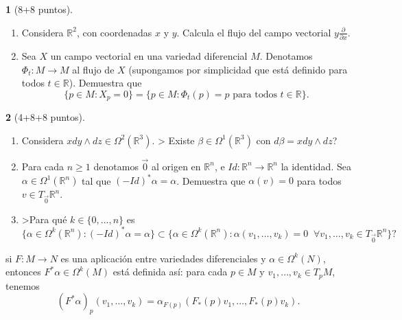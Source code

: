 \documentclass[12pt,a4paper]{report}
\theoremstyle{definition}
\newtheorem{ex}{}
\newcommand{\pd}[1]{\frac{\partial}{\partial #1}} %
\newcommand{\RR}{\ensuremath{\mathbb R}}
\begin{document}
\vspace{0.8cm}



\begin{ex}[8+8 puntos]
$\text{}$
\begin{enumerate}
\item Considera $\RR^2$, con coordenadas $x$ y $y$. Calcula el flujo del campo vectorial $y \pd{x}$.
\item  Sea $X$ un campo vectorial en una variedad diferencial $M$. 
Denotamos $\Phi_t : M \to M$ al flujo de $X$ (supongamos  por simplicidad que est\'a definido para todos $t\in \RR$).
Demuestra que
$$\{p\in M : X_p=0\}=\{p\in M: \Phi_t(p)=p \text{ para todos }t\in \RR\}.$$  \end{enumerate}
 \end{ex}


\vspace{0.8cm}

\begin{ex}[4+8+8 puntos] $\text{}$
\begin{enumerate}
\item Considera  $xdy\wedge dz\in \Omega^2(\RR^3)$. > Existe $\beta \in \Omega^1(\RR^3)$ con $d\beta=xdy\wedge dz$?
\item Para cada $n\ge 1$ denotamos $\overrightarrow{0}$ al origen en $\RR^n$, e $Id \colon 
\RR^n \to \RR^n$ la identidad. Sea $\alpha \in \Omega^1(\RR^n)$ tal que $(-Id)^*\alpha=\alpha$.
Demuestra que $\alpha(v)=0$ para todos $v\in T_{\overrightarrow{0}}\RR^n$.

\item  >Para qu\'e $k\in\{0,\dots,n\}$ es 
$$\{\alpha \in \Omega^k(\RR^n):(-Id)^*\alpha=\alpha\}\subset
  \{\alpha \in \Omega^k(\RR^n): \alpha(v_1,\dots,v_k)=0 \;\; \forall  v_1,\dots,v_k\in T_{\overrightarrow{0}}\RR^n\} ?$$
\end{enumerate}
 si $F \colon M\to N$ es una aplicaci\'on entre variedades diferenciales y $\alpha\in \Omega^k(N)$, entonces $F^*\alpha \in \Omega^k(M)$ est\'a definida as\'i: para cada $p\in M$ y  $v_1,\dots,v_k\in T_pM$, tenemos 
$$(F^*\alpha)_p(v_1,\dots,v_k)=\alpha_{F(p)}(F_*(p)v_1,\dots,F_*(p)v_k).$$
\end{ex} 
 
 
 
\vspace{0.8cm}
\end{document}
